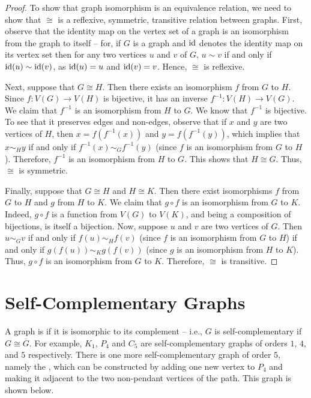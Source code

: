\begin{proof}
To show that graph isomorphism is an equivalence relation, we need to show that $\cong$ is a reflexive, symmetric, transitive relation between graphs. First, observe that the identity map on the vertex set of a graph is an isomorphism from the graph to itself -- for, if $G$ is a graph and $\mathrm{id}$ denotes the identity map on its vertex set then for any two vertices $u$ and $v$ of $G$, $u \sim v$ if and only if $\mathrm{id}(u) \sim \mathrm{id}(v)$, as $\mathrm{id}(u) = u$ and $\mathrm{id}(v) = v$. Hence, $\cong$ is reflexive.

Next, suppose that $G \cong H$. Then there exists an isomorphism $f$ from $G$ to $H$. Since $f \colon V(G) \to V(H)$ is bijective, it has an inverse $f^{-1} \colon V(H) \to V(G)$. We claim that $f^{-1}$ is an isomorphism from $H$ to $G$. We know that $f^{-1}$ is bijective. To see that it preserves edges and non-edges, observe that if $x$ and $y$ are two vertices of $H$, then $x = f(f^{-1}(x))$ and $y = f(f^{-1}(y))$, which implies that $x \sim_H y$ if and only if $f^{-1}(x) \sim_G f^{-1}(y)$ (since $f$ is an isomorphism from $G$ to $H$). Therefore, $f^{-1}$ is an isomorphism from $H$ to $G$. This shows that $H \cong G$. Thus, $\cong$ is symmetric.

Finally, suppose that $G \cong H$ and $H \cong K$. Then there exist isomorphisms $f$ from $G$ to $H$ and $g$ from $H$ to $K$. We claim that $g \circ f$ is an isomorphism from $G$ to $K$. Indeed, $g \circ f$ is a function from $V(G)$ to $V(K)$, and being a composition of bijections, is itself a bijection. Now, suppose $u$ and $v$ are two vertices of $G$. Then $u \sim_G v$ if and only if $f(u) \sim_H f(v)$ (since $f$ is an isomorphism from $G$ to $H$) if and only if $g(f(u)) \sim_K g(f(v))$ (since $g$ is an isomorphism from $H$ to $K$). Thus, $g \circ f$ is an isomorphism from $G$ to $K$. Therefore, $\cong$ is transitive.
\end{proof}


\section{Self-Complementary Graphs}\label{sec:SC}

A graph is  if it is isomorphic to its complement -- i.e., $G$ is self-complementary if $G \cong \overline G$. For example, $K_1$, $P_4$ and $C_5$ are self-complementary graphs of orders $1$, $4$, and $5$ respectively. There is one more self-complementary graph of order $5$, namely the , which can be constructed by adding one new vertex to $P_4$ and making it adjacent to the two non-pendant vertices of the path. This graph is shown below.

